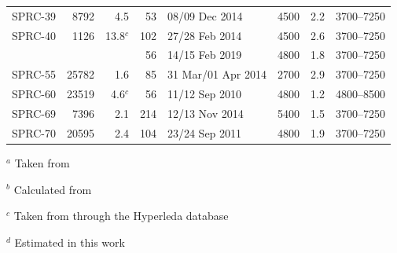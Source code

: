 \documentclass[useAMS,usenatbib]{mnras}
\begin{document}
\begin{table}
\begin{threeparttable}
\begin{small}
\begin{tabular}{lrrrllll}
			SPRC-39 & 8792   &  4.5 &   53& 08/09 Dec 2014  & 4500 &2.2 & 3700--7250 \\
			SPRC-40 & 1126   &      13.8$^c$ &   102& 27/28 Feb 2014 & 4500 & 2.6&3700--7250  \\
			& 		 								&       					 &  56 & 14/15 Feb 2019 & 4800 & 1.8 & 3700--7250  \\
			SPRC-55 & 25782    &     1.6 &    85&  31 Mar/01 Apr 2014 & 2700 & 2.9 & 3700--7250  \\
			SPRC-60 &  23519 & 4.6$^c$ & 56 & 11/12 Sep 2010 & 4800 & 1.2 & 4800--8500 \\
			SPRC-69 & 7396   &   2.1&   214& 12/13 Nov 2014 & 5400 & 1.5 & 3700--7250   \\
			SPRC-70 & 20595 & 2.4 & 104 & 23/24 Sep 2011 & 4800 & 1.9 &  3700--7250 \\
			\hline
		\end{tabular}
		
	\begin{tablenotes}
      \item $^a$ Taken from \citet{sprc}
	  \item $^b$ Calculated from \citet{Reshetnikov2015}
	  \item $^c$ Taken from \citet{DR12} through the Hyperleda database
	  \item $^d$ Estimated in this work
    \end{tablenotes}
	\end{small}
  \end{threeparttable}
\end{table}
\end{document}
